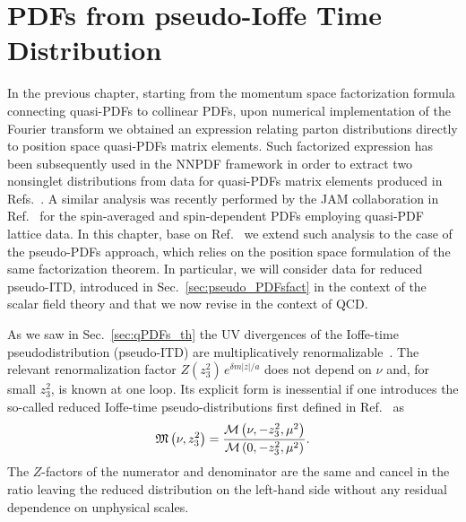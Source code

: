 \chapter{PDFs from pseudo-Ioffe Time Distribution}
\label{ch:ppdf_NNPDF}
In the previous chapter, 
starting from the momentum space factorization formula connecting quasi-PDFs to collinear PDFs,
upon numerical implementation of the Fourier transform we obtained an expression relating
parton distributions directly to position space quasi-PDFs matrix elements.
Such factorized expression has been subsequently used in the NNPDF framework in order to 
extract two nonsinglet distributions from data for quasi-PDFs matrix elements 
produced in Refs.~\cite{Alexandrou:2018pbm, Alexandrou:2019lfo}.
A similar analysis was recently performed by the JAM collaboration in Ref.~\cite{Bringewatt:2020ixn} 
for the spin-averaged and spin-dependent PDFs employing quasi-PDF lattice data.  
In this chapter, base on Ref.~\cite{DelDebbio:2020rgv} we extend such analysis to the case of the pseudo-PDFs approach,
which relies on the position space formulation of the same factorization theorem. 
In particular, we will consider data for reduced pseudo-ITD, introduced in Sec.~\ref{sec:pseudo_PDFsfact}
in the context of the scalar field theory and that we now revise in the context of QCD.

%
As we saw in Sec.~\ref{sec:qPDFs_th} the UV divergences of the Ioffe-time pseudodistribution (pseudo-ITD)
are multiplicatively renormalizable~\cite{Ji:2017oey,Ishikawa:2017faj}. 
The relevant renormalization factor $Z(z_3^2)\,e^{\delta m |z|/a}$ does not depend on $\nu$ and, 
for small $z_3^2$,   is known at one loop. 
Its explicit form is inessential if one introduces the so-called reduced 
Ioffe-time pseudo-distributions first defined in Ref.~\cite{Radyushkin:2017cyf}
as 
\begin{align}
	\label{eq:reducedIoffe}
	\mathfrak{M}\left(\nu, z_3^2\right) = \frac{\mathcal{M}\left( \nu,-z_3^2, \mu^2 \right)}{\mathcal{M}\left( 0,-z_3^2, \mu^2 \right)}. 
\end{align}
The $Z$-factors of the numerator and denominator are the same and cancel in the ratio leaving the reduced distribution
on the left-hand side without any residual dependence on 
unphysical scales. 


